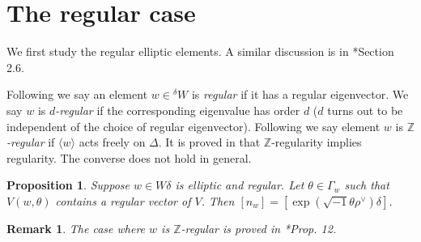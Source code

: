 \documentclass[10pt,leqno]{article}
\newtheorem{lemma}[equation]{Lemma}
\newtheorem{proposition}[equation]{Proposition}
\newtheorem{remark}[equation]{Remark}
{\theorembodyfont{\rmfamily}
\newtheorem{theoremplain}[equation]{Theorem}
\newtheorem{remarkplain}[equation]{Remark}
\newtheorem{editorialremarkplain}[equation]{Editorial Remark}
\newtheorem{exampleplain}[equation]{Example}
\newtheorem{corollaryplain}[equation]{Corollary}
}
\renewcommand{\sec}[1]{\section{#1}
\renewcommand{\theequation}{\thesection.\arabic{equation}}
  \setcounter{equation}{0}}
\def\G{\Gamma}
\def\d{\delta}
\renewcommand{\sec}[1]{\section{#1}
\renewcommand{\theequation}{\thesection.\arabic{equation}}
  \setcounter{equation}{0}}
\begin{document}
\sec{The regular case}
\label{s:regular}

We first study the regular elliptic elements. 
A similar discussion is in \cite{reeder_torsion}*{Section 2.6}.

Following
\cite{springer_regular} we say an element $w \in {}^{\delta} W$ is {\it regular} if it has a
regular eigenvector. We say $w$ is {\it $d$-regular} if the corresponding eigenvalue has
order $d$ ($d$ turns out to be independent of the choice of regular eigenvector).
Following \cite{rgly} we say
element $w$ is {\it $\mathbb Z$-regular} if $\langle w\rangle$ acts freely
on $\Delta$. It is proved in \cite[Prop. 1]{rgly} that $\mathbb Z$-regularity implies regularity. The converse does not hold in general. %

\begin{comment}
\begin{lemma} Suppose $w\in W\delta$ is $d$-regular.  Then
$o(w)=\text{lcm}(o(\delta),d)$.  The following conditions are
equivalent:
	\begin{enumerate}
		\item $d=o(w)$,
		\item $o(\delta)$ divides $d$,
		\item $w$ is $\mathbb Z$-regular.
	\end{enumerate}
\end{lemma}
In particular if $w$ is regular then it is $d$-regular for some $d$,  and if $\delta=\text{id}$ the converse holds.
The converse does not hold in general.  See \cite{rgly}*{after Proposition 1}.
\end{comment}


\begin{proposition}\label{regular} Suppose $w \in W\d$ is elliptic and
regular. Let $\theta \in \G_w$ such that $V(w, \theta)$ contains a
regular vector of $V$. Then $[n_w]=[\exp(\sqrt{-1} \theta\rho^\vee)\delta]$.
\end{proposition}

\begin{remark}
	The case where $w$ is $\mathbb Z$-regular is proved in \cite{rgly}*{Prop. 12}.
\end{remark}
\end{document}
